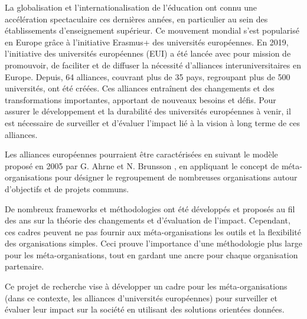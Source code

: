 La globalisation et l'internationalisation de l'éducation ont connu une accélération spectaculaire ces dernières années, en particulier au sein des établissements d'enseignement supérieur. Ce mouvement mondial s'est popularisé en Europe grâce à l'initiative Erasmus+ des universités européennes. En 2019, l'initiative des universités européennes (EUI) a été lancée avec pour mission de promouvoir, de faciliter et de diffuser la nécessité d'alliances interuniversitaires en Europe. Depuis, 64 alliances, couvrant plus de 35 pays, regroupant plus de 500 universités, ont été créées. Ces alliances entraînent des changements et des transformations importantes, apportant de nouveaux besoins et défis. Pour assurer le développement et la durabilité des universités européennes à venir, il est nécessaire de surveiller et d'évaluer l'impact lié à la vision à long terme de ces alliances.

Les alliances européennes pourraient être caractérisées en suivant le modèle proposé en 2005 par G. Ahrne et N. Brunsson \cite{ahrne_organizations_2005}, en appliquant le concept de méta-organisations pour désigner le regroupement de nombreuses organisations autour d'objectifs et de projets communs. 

De nombreux frameworks et méthodologies ont été développés et proposés au fil des ans sur la théorie des changements et  d'évaluation de l'impact. Cependant, ces cadres peuvent ne pas fournir aux méta-organisations les outils et la flexibilité des organisations simples. Ceci prouve l'importance d'une méthodologie plus large pour les méta-organisations, tout en gardant une ancre pour chaque organisation partenaire.

Ce projet de recherche vise à développer un cadre pour les méta-organisations (dans ce contexte, les alliances d'universités européennes) pour surveiller et évaluer leur impact sur la société en utilisant des solutions orientées données.